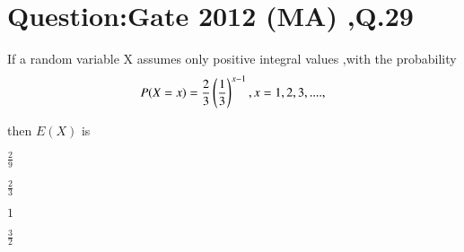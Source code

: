 \documentclass[journal,12pt,twocolumn]{IEEEtran}
\begin{document}
\section*{Question:Gate 2012 (MA) ,Q.29}
If a random variable X assumes only positive integral values ,with the probability
\begin{equation}
 P(X=x)=\frac{2}{3}\left(\frac{1}{3}\right)^{x-1},x=1,2,3,....,   
\end{equation}

then $E(X)$ is 
\begin{enumerate}[(A)]
\begin{multicols}{2}
\item $ \frac{2}{9}$\\
\item $\frac{2}{3}$\\
\item $ 1$\\
\item $\frac{3}{2}$
\end{multicols}
\end{enumerate}
\end{document}
